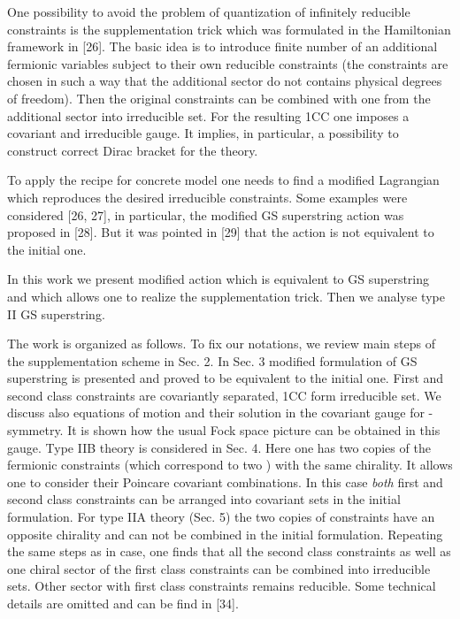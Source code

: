 \documentclass[a4paper]{article}
\begin{document}
One possibility to avoid the problem of quantization of infinitely 
reducible constraints is the supplementation trick which was formulated 
in the Hamiltonian framework in [26]. The basic idea is to introduce 
finite number of an additional fermionic variables subject to their 
own reducible 
constraints (the constraints are chosen in such a way that the additional 
sector do not contains physical degrees of freedom). Then the original 
constraints can be combined with one from the additional sector into 
irreducible set. For the resulting 1CC one imposes a covariant 
and irreducible 
gauge. It implies, in particular, a possibility to construct correct 
Dirac bracket for the theory. 

To apply the recipe for concrete model one needs to find a modified 
Lagrangian which reproduces the desired irreducible constraints. 
Some examples were considered [26, 27], in particular, the modified 
\coordHE{} GS superstring  action was proposed in [28]. But it was pointed 
in [29]  that the action is not equivalent to the initial one.

In this work we present modified action which is equivalent to \coordHE{} 
GS superstring and which allows one to realize the supplementation 
trick. Then we analyse type II GS superstring.  

The work is organized as follows. To fix our notations, we review main 
steps of the supplementation scheme in Sec. 2. 
In Sec. 3 modified formulation
of \coordHE{} GS superstring is presented and proved to be
equivalent to the initial one. First and second class constraints are
covariantly separated, 1CC form irreducible set. We discuss also 
equations of motion
and their solution in the covariant gauge for \myHighlight{$\kappa$}\coordHE{}-symmetry. 
It is shown how the usual Fock space picture can be obtained in this 
gauge. Type IIB theory is considered in Sec. 4. Here one 
has two copies of the fermionic constraints (which correspond
to two \coordHE{}) with the same chirality. It allows one to
consider their Poincare covariant combinations. In this case 
{\em{both}} first
and second class constraints can be arranged into covariant sets in the
initial formulation. For type IIA theory (Sec. 5) the two copies of
constraints have an opposite chirality and can not be combined in the
initial formulation. Repeating the same steps as in \coordHE{} case, one
finds that all the second class constraints as well as one chiral sector
of the first class constraints can be combined into irreducible sets.
Other sector with first class constraints remains reducible. 
Some technical details are omitted and can be find 
in [34].
\end{document}
